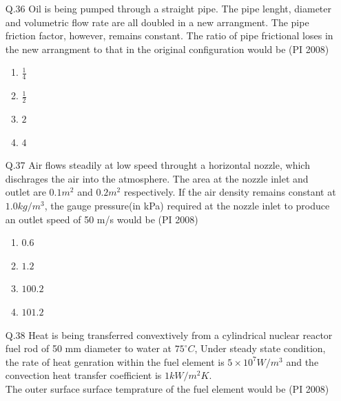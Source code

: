 \documentclass[journal,12pt,onecolumn]{IEEEtran}
\theoremstyle{remark}
\begin{document}
\begin{enumerate}
\begin{multicols}{4}
\begin{enumerate}[label=(\Alph*)]
    \end{enumerate}
\end{multicols}
\vspace{1cm}
 \item[\textnormal{Q.36}] Oil is being pumped through a straight pipe. The pipe lenght, diameter and volumetric flow rate are all doubled in a new arrangment. The pipe friction factor, however, remains constant. The ratio of pipe frictional loses in the new arrangment to that in the original configuration would be   
    \hfill{(PI 2008)}
    \begin{multicols}{4}
    \begin{enumerate}[label=(\Alph*)]
        \item $\frac{1}{4}$
        \item $\frac{1}{2}$
        \item $2$
        \item $4$
    \end{enumerate}
\end{multicols}
\vspace{1cm}
 \item[\textnormal{Q.37}] Air flows steadily at low speed throught a horizontal nozzle, which dischrages the air into the atmosphere. The area at the nozzle inlet and outlet are $0.1m^2$ and $0.2m^2$ respectively. If the air density remains constant at $1.0kg/m^3$, the gauge pressure(in kPa) required at the nozzle inlet to produce an outlet speed of 50 m/s would be  
    \hfill{(PI 2008)}
    \begin{multicols}{4}
    \begin{enumerate}[label=(\Alph*)]
        \item $0.6$
        \item $1.2$
        \item $100.2$
        \item $101.2$
    \end{enumerate}
\end{multicols}
\vspace{1cm}
 \item[\textnormal{Q.38}] Heat is being transferred convextively from a cylindrical nuclear reactor fuel rod of 50 mm diameter to water at $75^{\circ}C$, Under steady state condition, the rate of heat genration within the fuel element is $5\times10^7W/m^3$ and the convection heat transfer coefficient is $1kW/m^2K$. \\
 The outer surface surface temprature of the fuel element would be
    \hfill{(PI 2008)}
    \begin{multicols}{4}

\end{multicols}
\end{enumerate}
\end{document}
